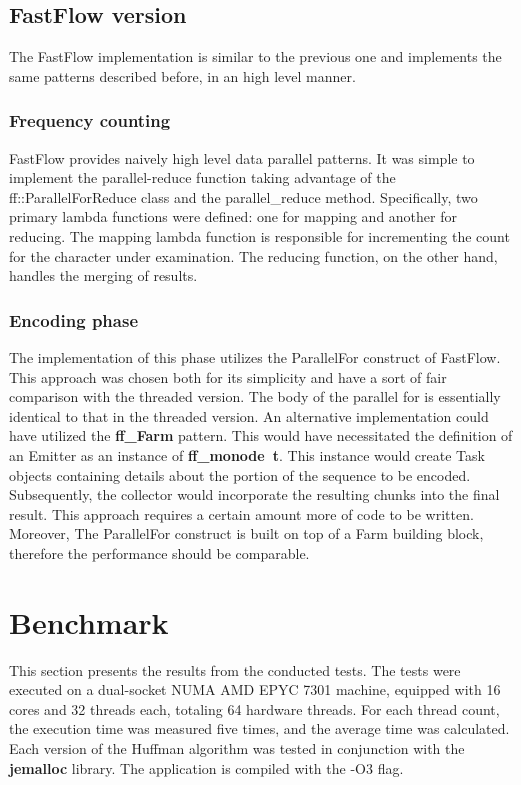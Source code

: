\documentclass{article}
\begin{document}
\subsection{FastFlow version}
The FastFlow implementation is similar to the previous one and
implements the same patterns described before, in an high level manner.
\subsubsection{Frequency counting}
FastFlow provides naively high level data parallel patterns. It was simple
to implement the parallel-reduce function taking advantage of the ff::ParallelForReduce
class and the parallel\_reduce method.
Specifically, two primary lambda functions were defined: one for mapping and another for reducing.
The mapping lambda function is responsible for incrementing the count for the character under examination.
The reducing function, on the other hand, handles the merging of results.
\subsubsection{Encoding phase}
The implementation of this phase utilizes the ParallelFor construct of FastFlow.
This approach was chosen both for its simplicity and have a sort of fair comparison
with the threaded version. The body of the parallel for is essentially identical
to that in the threaded version.
An alternative implementation could have utilized the \textbf{ff\_Farm} pattern.
This would have necessitated the definition of an Emitter as an instance of \textbf{ff\_monode\ t}.
This instance would create Task objects containing details about the portion of the sequence to be
encoded. Subsequently, the collector would incorporate the resulting chunks into the final result.
This approach requires a certain amount more of code to be written. Moreover, The ParallelFor
construct is built on top of a Farm building block, therefore the performance should be comparable.

\section{Benchmark}
This section presents the results from the conducted tests. The tests were executed on a dual-socket NUMA
AMD EPYC 7301 machine, equipped with 16 cores and 32 threads each, totaling 64 hardware threads.
For each thread count, the execution time was measured five times, and the average time was calculated.
Each version of the Huffman algorithm was tested in conjunction with the \textbf{jemalloc} library.
The application is compiled with the -O3 flag.
\end{document}

